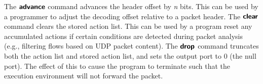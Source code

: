 The $\bm{\mathsf{{advance}}}$ command advances the header offset by \textit{n} bits.
This can be used by a programmer to adjust the decoding offset relative to a
packet header.
The $\bm{\mathsf{{clear}}}$ command clears the stored action list. This can be used
by a program reset any accumulated actions if certain conditions are detected
during packet analysis (e.g., filtering flows based on UDP packet content).
The $\bm{\mathsf{{drop}}}$ command truncates both the action list and stored action list,
and sets the output port to 0 (the null port). 
The effect of this to cause the program to terminate such that the execution 
environment will not forward the packet.
 









